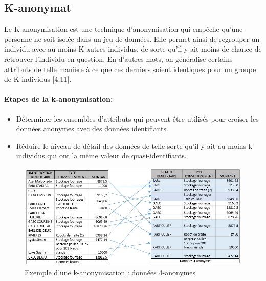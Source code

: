 \subsection{K-anonymat} 

Le K-anonymisation est une technique d’anonymisation qui empêche qu’une personne ne soit isolée dans un jeu de données. Elle permet ainsi de regrouper un individu avec au moins K autres individus, de sorte qu’il y ait moins de chance de retrouver l’individu en question. En d’autres mots, on généralise certains attributs de telle manière à ce que ces derniers soient identiques pour un groupe de K individus [4;11]. 

\paragraph{Etapes de la k-anonymisation:} 
\begin{itemize}
    \item  Déterminer les ensembles d’attributs qui peuvent être utilisés pour croiser les données anonymes avec des données identifiants. 

    \item Réduire le niveau de détail des données de telle sorte qu’il y ait au moins k individus qui ont la même valeur de quasi-identifiants. 
\end{itemize}

\begin{figure}[!h]
    \centering
    \includegraphics[width=1\textwidth]{images/anonymisation/k_anonym_image1.png}
    \caption{Exemple d'une k-anonymisation : données 4-anonymes}
    \label{Exemple d'une k-anonymisation : données 4-anonymes}
\end{figure}


